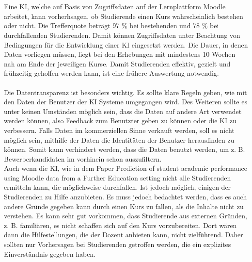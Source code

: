 \\
\\ \noindent
Eine KI, welche auf Basis von Zugriffsdaten auf der Lernplattform Moodle arbeitet, kann vorherhsagen, ob Studierende einen Kurs wahrscheinlich bestehen oder nicht. Die Trefferquote beträgt 97 \% bei bestehenden und 78 \% bei durchfallenden Studierenden. Damit können Zugriffsdaten unter Beachtung von Bedingungen für die Entwicklung einer KI eingesetzt werden. Die Dauer, in denen Daten vorliegen müssen, liegt bei den Erhebungen mit mindestens 10 Wochen nah am Ende der jeweiligen Kurse. Damit Studierenden effektiv, gezielt und frühzeitig geholfen werden kann, ist eine frühere Auswertung notwendig.
\\
\\ \noindent
Die Datentransparenz ist besonders wichtig.
Es sollte klare Regeln geben, wie mit den Daten der Benutzer der KI Systeme umgegangen wird.
Des Weiteren sollte es unter keinen Umständen möglich sein, dass die Daten auf andere Art verwendet werden können, also Feedback zum Benutzter geben zu können oder die KI zu verbessern.
Falls Daten im kommerziellen Sinne verkauft werden, soll es nicht möglich sein, mithilfe der Daten die Identitäten der Benutzer herausfinden zu können.
Somit kann verhindert werden, dass die Daten benutzt werden, um z. B. Bewerberkandidaten im vorhinein schon auszufiltern. %
\\ \noindent
Auch wenn die KI, wie in dem Paper \glqq Prediction of student academic performance using Moodle data from a Further Education setting\grqq{} nicht alle Studierenden ermitteln kann, die möglichweise durchfallen. %
Ist jedoch möglich, einigen der Studierenden zu Hilfe anzubieten. Es muss jedoch bedachtet werden, dass es auch andere Gründe gegeben kann durch einen Kurs zu fallen, als die Inhalte nicht zu verstehen.
Es kann sehr gut vorkommen, dass Studierende aus externen Gründen, z. B. familiären, es nicht schaffen sich auf den Kurs vorzubereiten.
Dort wären dann die Hilfestellungen, die der Dozent anbieten kann, nicht zielführend.
Daher sollten nur Vorhersagen bei Studierenden getroffen werden, die ein explizites Einverständnis gegeben haben.
